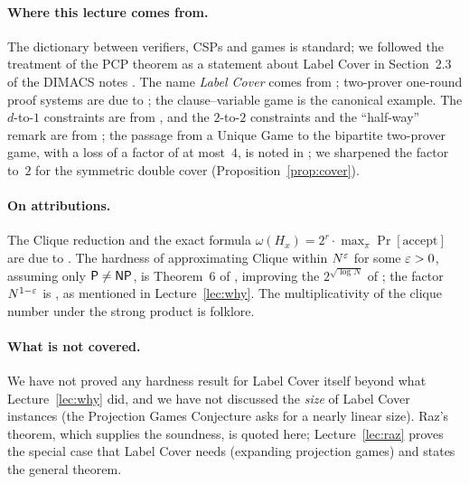 \paragraph{Where this lecture comes from.}
The dictionary between verifiers, CSPs and games is standard; we followed the treatment of the PCP theorem as a statement about Label Cover in Section~2.3 of the DIMACS notes \citep{DIMACS10}.  The name \emph{Label Cover}
comes from \citet{ABSS97}; two-prover one-round proof systems are due to \citet{FeigeLovasz92}; the clause--variable game is the canonical example.  The $d$-to-$1$ constraints are from \citet{Khot02}, and the $2$-to-$2$ constraints and the
``half-way'' remark are from \citet{Khot19}; the passage from a Unique Game to the bipartite two-prover game, with a loss of a factor of at most~$4$, is noted in \citet{Khot10}; we sharpened the factor to~$2$ for
the symmetric double cover (Proposition~\ref{prop:cover}).

\paragraph{On attributions.}
The Clique reduction and the exact formula $\omega(H_x)=2^r\cdot\max_\pi\Pr[\text{accept}]$ are due to \citet{FGLSS96}.  The hardness of approximating Clique within $N^\varepsilon$ for some $\varepsilon>0$, assuming only $\mathsf{P}\ne\mathsf{NP}$, is Theorem~6 of
\citet{ALMSS98}, improving the $2^{\sqrt{\log N}}$ of \citet{AroraSafra98}; the factor $N^{1-\varepsilon}$ is \citet{Hastad99}, as mentioned in Lecture~\ref{lec:why}.  The multiplicativity of the clique number under the strong
product is folklore.

\paragraph{What is not covered.}
We have not proved any hardness result for Label Cover itself beyond what Lecture~\ref{lec:why} did, and we have not discussed the \emph{size} of Label Cover instances (the Projection Games Conjecture asks for a nearly linear size).
Raz's theorem, which supplies the soundness, is quoted here; Lecture~\ref{lec:raz} proves the special case that Label Cover needs (expanding projection games) and states the general theorem.
